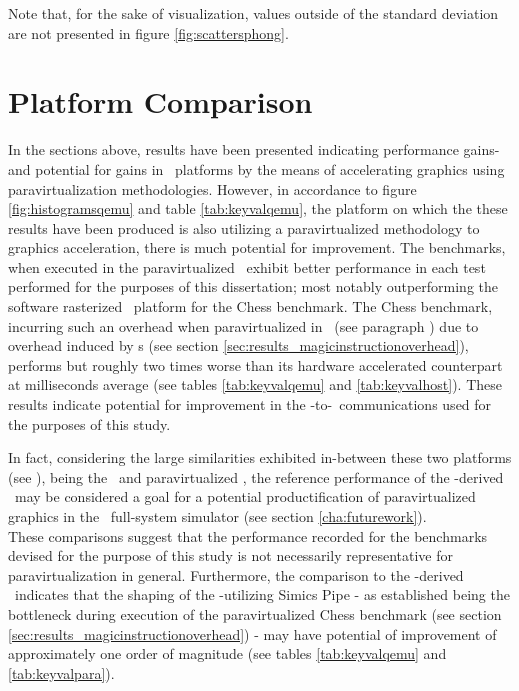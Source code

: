 \noindent
Note that, for the sake of visualization, values outside of the standard deviation are not presented in figure \ref{fig:scattersphong}.




\section{Platform Comparison}
\label{sec:analysisexperiment_platformcomparison}
In the sections above, results have been presented indicating performance gains- and potential for gains in \dvttermsimics\ platforms by the means of accelerating graphics using paravirtualization methodologies.
However, in accordance to figure \ref{fig:histogramsqemu} and table \ref{tab:keyvalqemu}, the platform on which the these results have been produced is also utilizing a paravirtualized methodology to graphics acceleration, there is much potential for improvement.
The benchmarks, when executed in the paravirtualized \dvttermandroidemulator\ exhibit better performance in each test performed for the purposes of this dissertation; most notably outperforming the software rasterized \dvttermsimics\ platform for the Chess benchmark.
The Chess benchmark, incurring such an overhead when paravirtualized in \dvttermsimics\ (see paragraph ) due to overhead induced by \dvttermmagicinstruction s (see section \ref{sec:results_magicinstructionoverhead}), performs but roughly two times worse than its hardware accelerated counterpart at  milliseconds average (see tables \ref{tab:keyvalqemu} and \ref{tab:keyvalhost}).
These results indicate potential for improvement in the \dvttermtarget -to-\dvttermhost\ communications used for the purposes of this study.

In fact, considering the large similarities exhibited in-between these two platforms (see ), being the \dvttermandroidemulator\ and paravirtualized \dvttermsimics , the reference performance of the \dvttermqemu -derived \dvttermandroidemulator\ may be considered a goal for a potential productification of paravirtualized graphics in the \dvttermsimics\ full-system simulator (see section \ref{cha:futurework}).\\

\noindent
These comparisons suggest that the performance recorded for the benchmarks devised for the purpose of this study is not necessarily representative for paravirtualization in general.
Furthermore, the comparison to the \dvttermqemu -derived \dvttermandroidemulator\ indicates that the shaping of the \dvttermmagicinstruction -utilizing Simics Pipe - as established being the bottleneck during execution of the paravirtualized Chess benchmark (see section \ref{sec:results_magicinstructionoverhead}) - may have potential of improvement of approximately one order of magnitude (see tables \ref{tab:keyvalqemu} and \ref{tab:keyvalpara}).
